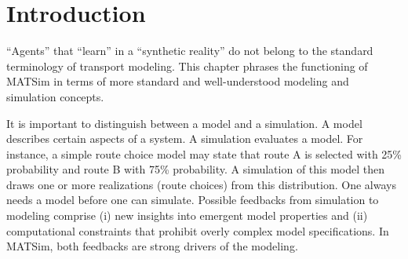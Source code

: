 

\makeatother



\newcommand{\MyEqRef}[1]{(\ref{#1})}

\newcommand{\note}[1]{\hl{[#1]}}
\newcommand{\Note}[1]{\note{#1}}



\section{Introduction}

{}``Agents'' that {}``learn'' in a {}``synthetic reality'' do
not belong to the standard terminology of transport modeling. This
chapter phrases the functioning of MATSim in terms of more standard
and well-understood modeling and simulation concepts.

It is important to distinguish between a model and a simulation. A
model describes certain aspects of a system. A simulation evaluates
a model. For instance, a simple route choice model may state that
route A is selected with 25\% probability and route B with 75\% probability.
A simulation of this model then draws one or more realizations (route
choices) from this distribution. One always needs a model before one
can simulate. Possible feedbacks from simulation to modeling comprise
(i) new insights into emergent model properties and (ii) computational
constraints that prohibit overly complex model specifications. In
MATSim, both feedbacks are strong drivers of the modeling. 

